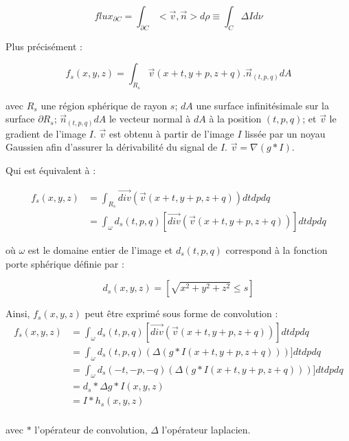   \begin{equation}
    flux_{\partial C} = \int_{\partial C}< \vec{v},\vec{n} > d\rho \equiv \int_{C }\Delta I d\nu
  \end{equation}
  
  Plus précisément :
  
  \begin{equation}
    f_s(x,y,z) = \int_{R_s}\vec{v}(x+t,y+p, z+q) . \vec{n}_{(t,p,q)}dA
  \end{equation}
  
  avec $R_s$ une région sphérique de rayon $s$; $dA$ une surface infinitésimale sur la surface $\partial R_s$; $\vec{n}_{(t,p,q)}dA$ le vecteur normal à $dA$ à la position $(t,p,q)$; et $\vec{v}$ le gradient de l'image $I$. $\vec{v}$ est obtenu à partir de l'image $I$ lissée par un noyau Gaussien afin d'assurer la dérivabilité du signal de $I$. $\vec{v}=\nabla(g*I)$.
  
  Qui est équivalent à :
  
  \begin{align}
    f_s(x,y,z) & = \int_{R_s} \vec{div}( \vec{v}(x+t,y+p, z+q) ) dtdpdq \\
    & = \int_{\omega} d_s(t,p,q) [\vec{div}( \vec{v}(x+t,y+p, z+q) )] dtdpdq
  \end{align}
  
  où $\omega$ est le domaine entier de l'image et $d_s(t,p,q)$ correspond à la fonction porte sphérique définie par :
  
  \begin{equation}
  d_s(x,y,z) = [\sqrt{x^2 + y^2 + z^2} \leq s]
  \end{equation}
  
  Ainsi, $f_s(x,y,z)$ peut être exprimé sous forme de convolution :
  \begin{align}
    f_s(x,y,z) & = \int_{\omega} d_s(t,p,q) [\vec{div}( \vec{v}(x+t,y+p, z+q) )] dtdpdq \\
               & = \int_{\omega} d_s(t,p,q) (\Delta(g*I(x+t,y+p, z+q)))] dtdpdq \\
               & = \int_{\omega} d_s(-t,-p,-q) (\Delta(g*I(x+t,y+p, z+q)))] dtdpdq \\
               & = d_s * \Delta g * I(x,y,z) \\
               & = I * h_s(x,y,z) \\
  \end{align}
  
  avec $*$ l'opérateur de convolution, $\Delta$ l'opérateur laplacien.
  
